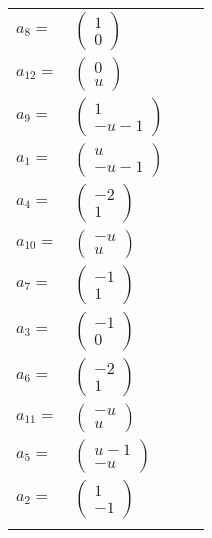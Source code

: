 \documentclass[1p]{elsarticle_modified}
\theoremstyle{definition}
\begin{document}
\begin{tabular}{m{7pt} m{180pt} m{7pt} m{180pt} }
\flushright $a_{8}=$&$\begin{pmatrix}1\\0\end{pmatrix}$ \\
\flushright $a_{12}=$&$\begin{pmatrix}0\\u\end{pmatrix}$ \\
\flushright $a_{9}=$&$\begin{pmatrix}1\\- u-1\end{pmatrix}$ \\
\flushright $a_{1}=$&$\begin{pmatrix}u\\- u-1\end{pmatrix}$ \\
\flushright $a_{4}=$&$\begin{pmatrix}-2\\1\end{pmatrix}$ \\
\flushright $a_{10}=$&$\begin{pmatrix}- u\\u\end{pmatrix}$ \\
\flushright $a_{7}=$&$\begin{pmatrix}-1\\1\end{pmatrix}$ \\
\flushright $a_{3}=$&$\begin{pmatrix}-1\\0\end{pmatrix}$ \\
\flushright $a_{6}=$&$\begin{pmatrix}-2\\1\end{pmatrix}$ \\
\flushright $a_{11}=$&$\begin{pmatrix}- u\\u\end{pmatrix}$ \\
\flushright $a_{5}=$&$\begin{pmatrix}u-1\\- u\end{pmatrix}$ \\
\flushright $a_{2}=$&$\begin{pmatrix}1\\-1\end{pmatrix}$\\&\end{tabular}
\end{document}
